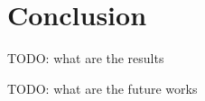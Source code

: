 
\section{Conclusion}
\label{sec:conclusion}

TODO: what are the results

TODO: what are the future works
